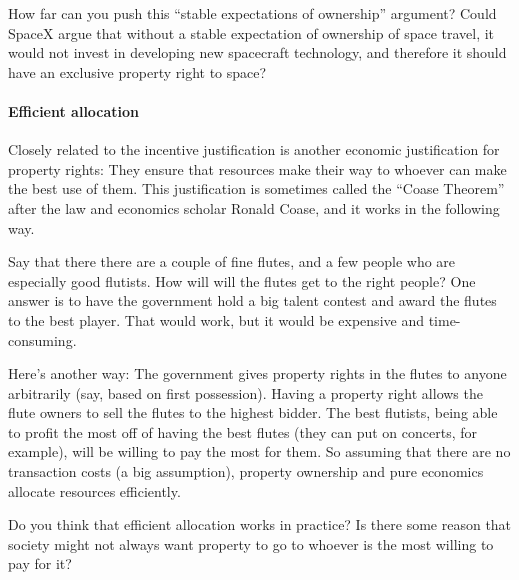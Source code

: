 How far can you push this ``stable expectations of ownership'' argument? Could
SpaceX argue that without a stable expectation of ownership of space travel, it
would not invest in developing new spacecraft technology, and therefore it
should have an exclusive property right to space?

\paragraph{Efficient allocation} Closely related to the incentive justification
is
another economic justification for property rights: They ensure that resources
make their way to whoever can make the best use of them. This justification is
sometimes called the ``Coase Theorem'' after the law and economics scholar
Ronald Coase, and it works in the following way.

Say that there there are a couple of fine flutes, and a few people who are
especially good flutists. How will will the flutes get to the right people? One
answer is to have the government hold a big talent contest and award the flutes
to the best player. That would work, but it would be expensive and
time-consuming.

Here's another way: The government gives property rights in the flutes to
anyone arbitrarily (say, based on first possession). Having a property right
allows the flute owners to sell the flutes to the highest bidder. The best
flutists,
being able to profit the most off of having the best flutes (they can put on
concerts, for example), will be willing to pay the most for them. So assuming
that there are no transaction costs (a big assumption), property ownership and
pure economics allocate resources efficiently.

Do you think that efficient allocation works in practice? Is
there some reason that society might not always want property to go to whoever
is the most willing to pay for it?




